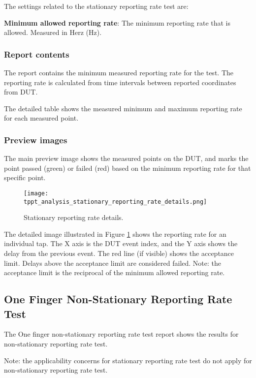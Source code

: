 The settings related to the stationary reporting rate test are:

\textbf{Minimum allowed reporting rate}: The minimum reporting rate that is allowed. Measured in Herz (Hz).

\subsubsection{Report contents}

The report contains the minimum measured reporting rate for the test. The reporting rate is calculated from time intervals between reported coordinates from DUT. 

The detailed table shows the measured minimum and maximum reporting rate for each measured point. 

\subsubsection{Preview images}

The main preview image shows the measured points on the DUT, and marks the point passed (green) or failed (red) based on the minimum reporting rate for that specific point.

\begin{figure}[!h]
	\centering
	\texttt{[image: tppt\_analysis\_stationary\_reporting\_rate\_details.png]}
	\caption{Stationary reporting rate details.}
	\label{fig:tppt_analysis_stationary_reporting_rate_details}
\end{figure}

The detailed image illustrated in Figure \ref{fig:tppt_analysis_stationary_reporting_rate_details} shows the reporting rate for an individual tap. The X axis is the DUT event index, and the Y axis shows the delay from the previous event. The red line (if visible) shows the acceptance limit. Delays above the acceptance limit are considered failed. Note: the acceptance limit is the reciprocal of the minimum allowed reporting rate.

\subsection{One Finger Non-Stationary Reporting Rate Test}

The One finger non-stationary reporting rate test report shows the results for non-stationary reporting rate test.

Note: the applicability concerns for stationary reporting rate test do not apply for non-stationary reporting rate test.

